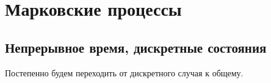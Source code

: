\section{Марковские процессы}
\subsection{Непрерывное время, дискретные состояния}
Постепенно будем переходить от дискретного случая к общему. 